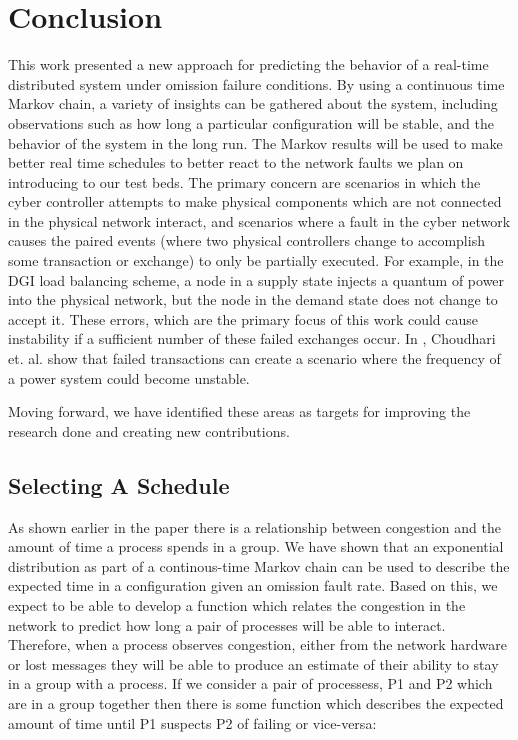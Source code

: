 \chapter{Conclusion}

This work presented a new approach for predicting the behavior of a real-time distributed system under omission failure conditions. By using a continuous time Markov chain, a variety of insights can be gathered about the system, including observations such as how long a particular configuration will be stable, and the behavior of the system in the long run.  The Markov results will be used  to make better real time schedules to better react to the network faults we plan on introducing to our test beds. The primary concern are scenarios in which the cyber controller attempts to make physical components which are not connected in the physical network interact, and scenarios where a fault in the cyber network causes the paired events (where two physical controllers change to accomplish some transaction or exchange) to only be partially executed. For example, in the DGI load balancing scheme, a node in a supply state injects a quantum of power into the physical network, but the node in the demand state does not change to accept it. These errors, which are the primary focus of this work could cause instability if a sufficient number of these failed exchanges occur. In \cite{HARINI}, Choudhari et. al. show that failed transactions can create a scenario where the frequency of a power system could become unstable. 

Moving forward, we have identified these areas as targets for improving the research done and creating new contributions.

\section{Selecting A Schedule}

As shown earlier in the paper there is a relationship between congestion and the amount of time a process spends in a group. We have shown that an exponential distribution as part of a continous-time Markov chain can be used to describe the expected time in a configuration given an omission fault rate. Based on this, we expect to be able to develop a function which relates the congestion in the network to predict how long a pair of processes will be able to interact. Therefore, when a process observes congestion, either from the network hardware or lost messages they will be able to produce an estimate of their ability to stay in a group with a process. If we consider a pair of processess, P1 and P2 which are in a group together then there is some function which describes the expected amount of time until P1 suspects P2 of failing or vice-versa:

